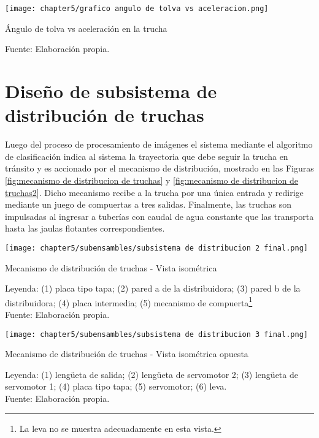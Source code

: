 
\begin{myfigure}[H]
	\footnotesize\centering
	\texttt{[image: chapter5/grafico angulo de tolva vs aceleracion.png]}
	\caption{Ángulo de tolva vs aceleración en la trucha}
	\begin{myflushcenter}
		Fuente: Elaboración propia.
	\end{myflushcenter}
	\label{fig:grafico angulo de tolva vs aceleracion}
\end{myfigure}

\vspace{-2.0em}

\section{Diseño de subsistema de distribución de truchas}

Luego del proceso de procesamiento de imágenes el sistema mediante el algoritmo de clasificación indica al sistema la trayectoria que debe seguir la trucha en tránsito y es accionado por el mecanismo de distribución, mostrado en las Figuras \ref{fig:mecanismo de distribucion de truchas} y \ref{fig:mecanismo de distribucion de truchas2}. Dicho mecanismo recibe a la trucha por una única entrada y redirige mediante un juego de compuertas a tres salidas. Finalmente, las truchas son impulsadas al ingresar a tuberías con caudal de agua constante que las transporta hasta las jaulas flotantes correspondientes.

\begin{myfigure}[H]
	\footnotesize\centering
	\texttt{[image: chapter5/subensambles/subsistema de distribucion 2 final.png]}
	\caption{Mecanismo de distribución de truchas - Vista isométrica}
	\begin{myflushcenter}
		Leyenda: (1) placa tipo tapa; (2) pared a de la distribuidora; (3) pared b de la distribuidora; (4) placa intermedia; (5) mecanismo de compuerta\footnote{La leva no se muestra adecuadamente en esta vista.} \\
		Fuente: Elaboración propia.
	\end{myflushcenter}
	\label{fig:mecanismo de distribucion de truchas}
\end{myfigure}


\begin{myfigure}[H]
	\footnotesize\centering
	\texttt{[image: chapter5/subensambles/subsistema de distribucion 3 final.png]}
	\caption{Mecanismo de distribución de truchas - Vista isométrica opuesta}
	\begin{myflushcenter}
		Leyenda: (1) lengüeta de salida; (2) lengüeta de servomotor 2; (3) lengüeta de servomotor 1; (4) placa tipo tapa; (5) servomotor; (6) leva.\\
		Fuente: Elaboración propia.
	\end{myflushcenter}
	\label{fig:mecanismo de distribucion de truchas2}
\end{myfigure}

